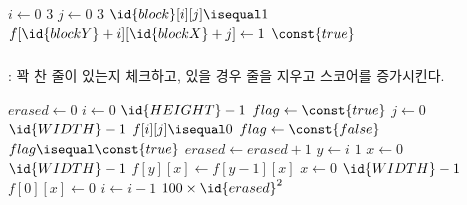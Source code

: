 \begin{codebox}
\li \For $i \gets 0$ \To $3$
\li \Do
        \For $j \gets 0$ \To $3$
\li     \Do
            \If $\id{block}[i][j] \isequal 1$
\li         \Then
                $f[\id{blockY} + i][\id{blockX} + j] \gets 1$
            \End
        \End
    \End
\li \Return $\const{true}$
\end{codebox}

\subsubsection{}: 꽉 찬 줄이 있는지 체크하고, 있을 경우 줄을 지우고 스코어를 증가시킨다.

\begin{codebox}
\li $erased \gets 0$
\li \For $i \gets 0$ \To $\id{HEIGHT} - 1$
\li \Do
        $flag \gets \const{true}$
\li     \For $j \gets 0$ \To $\id{WIDTH} - 1$
\li     \Do
            \If $f[i][j] \isequal 0$
\li         \Then
                $flag \gets \const{false}$
            \End
        \End
\li     \If $flag \isequal \const{true}$
            \Then
\li             $erased \gets erased + 1$
\li             \For $y \gets i$ \Downto $1$
\li             \Do
                    \For $x \gets 0$ \To $\id{WIDTH} - 1$
\li                 \Do
                        $f[y][x] \gets f[y - 1][x]$
                    \End
                \End
\li             \For $x \gets 0$ \To $\id{WIDTH} - 1$
\li             \Do
                    $f[0][x] \gets 0$
                \End
\li             $i \gets i - 1$
            \End
        \End
    \End
\li \Return $100 \times \id{erased}^2$
\end{codebox}


